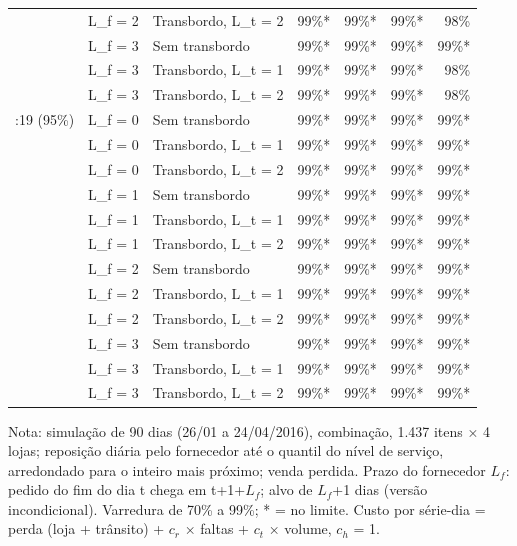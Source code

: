 \begin{table}[htbp]
\begin{tabular}{lllrrrr}
 & L\_f = 2 & Transbordo, L\_t = 2 & 99\%* & 99\%* & 99\%* & 98\% \\
 & L\_f = 3 & Sem transbordo & 99\%* & 99\%* & 99\%* & 99\%* \\
 & L\_f = 3 & Transbordo, L\_t = 1 & 99\%* & 99\%* & 99\%* & 98\% \\
 & L\_f = 3 & Transbordo, L\_t = 2 & 99\%* & 99\%* & 99\%* & 98\% \\
\addlinespace
1:19 (95\%) & L\_f = 0 & Sem transbordo & 99\%* & 99\%* & 99\%* & 99\%* \\
 & L\_f = 0 & Transbordo, L\_t = 1 & 99\%* & 99\%* & 99\%* & 99\%* \\
 & L\_f = 0 & Transbordo, L\_t = 2 & 99\%* & 99\%* & 99\%* & 99\%* \\
 & L\_f = 1 & Sem transbordo & 99\%* & 99\%* & 99\%* & 99\%* \\
 & L\_f = 1 & Transbordo, L\_t = 1 & 99\%* & 99\%* & 99\%* & 99\%* \\
 & L\_f = 1 & Transbordo, L\_t = 2 & 99\%* & 99\%* & 99\%* & 99\%* \\
 & L\_f = 2 & Sem transbordo & 99\%* & 99\%* & 99\%* & 99\%* \\
 & L\_f = 2 & Transbordo, L\_t = 1 & 99\%* & 99\%* & 99\%* & 99\%* \\
 & L\_f = 2 & Transbordo, L\_t = 2 & 99\%* & 99\%* & 99\%* & 99\%* \\
 & L\_f = 3 & Sem transbordo & 99\%* & 99\%* & 99\%* & 99\%* \\
 & L\_f = 3 & Transbordo, L\_t = 1 & 99\%* & 99\%* & 99\%* & 99\%* \\
 & L\_f = 3 & Transbordo, L\_t = 2 & 99\%* & 99\%* & 99\%* & 99\%* \\
\bottomrule
\end{tabular}
\par\smallskip
{\footnotesize Nota: simulação de 90 dias (26/01 a 24/04/2016), combinação, 1.437 itens × 4 lojas; reposição diária pelo fornecedor até o quantil do nível de serviço, arredondado para o inteiro mais próximo; venda perdida. Prazo do fornecedor $L_f$: pedido do fim do dia t chega em t+1+$L_f$; alvo de $L_f$+1 dias (versão incondicional). Varredura de 70\% a 99\%; * = no limite. Custo por série-dia = perda (loja + trânsito) + $c_r$ × faltas + $c_t$ × volume, $c_h$ = 1.}
\end{table}
